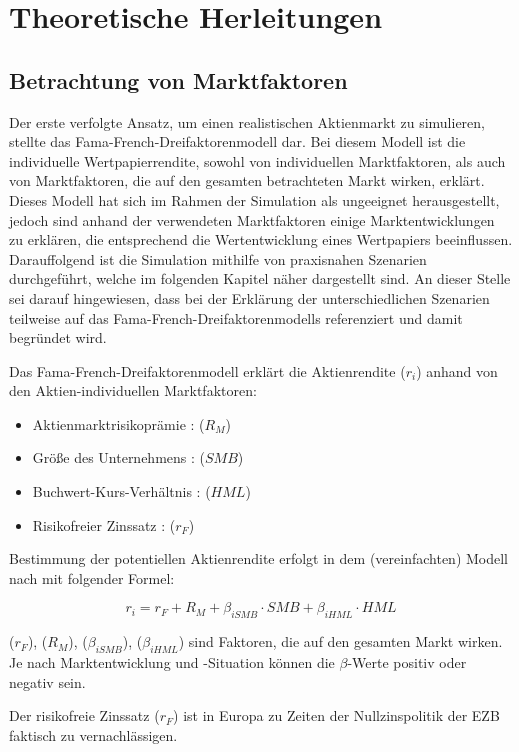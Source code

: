 \chapter{Theoretische Herleitungen}
\section{Betrachtung von Marktfaktoren}

Der erste verfolgte Ansatz, um einen realistischen Aktienmarkt zu simulieren, stellte das Fama-French-Dreifaktorenmodell dar. Bei diesem Modell ist die individuelle Wertpapierrendite, sowohl von individuellen Marktfaktoren, als auch von Marktfaktoren, die auf den gesamten betrachteten Markt wirken, erklärt. \\
Dieses Modell hat sich im Rahmen der Simulation als ungeeignet herausgestellt, jedoch sind anhand der verwendeten Marktfaktoren einige Marktentwicklungen zu erklären, die entsprechend die Wertentwicklung eines Wertpapiers beeinflussen.\\
Darauffolgend ist die Simulation mithilfe von praxisnahen Szenarien durchgeführt, welche im folgenden Kapitel näher dargestellt sind. An dieser Stelle sei darauf hingewiesen, dass bei der Erklärung der unterschiedlichen Szenarien teilweise auf das Fama-French-Dreifaktorenmodells referenziert und damit begründet wird.

Das Fama-French-Dreifaktorenmodell erklärt die Aktienrendite ($r_i$) anhand von den Aktien-individuellen Marktfaktoren:
\begin{itemize}
	\item Aktienmarktrisikoprämie : ($R_M$)
	\item Größe des Unternehmens : (${SMB}$)
	\item Buchwert-Kurs-Verhältnis : ($HML$)
	\item Risikofreier Zinssatz : ($r_F$)
\end{itemize}

Bestimmung der potentiellen Aktienrendite erfolgt in dem (vereinfachten) Modell nach mit folgender Formel:

$$ r_i = r_F + R_M + \beta_{iSMB} \cdot SMB + \beta_{iHML} \cdot HML$$

($r_F$), ($R_M$), ($\beta_{iSMB}$), ($\beta_{iHML}$) sind Faktoren, die auf den gesamten Markt wirken. Je nach Marktentwicklung und -Situation können die $\beta$-Werte positiv oder negativ sein.

Der risikofreie Zinssatz ($r_F$) ist in Europa zu Zeiten der Nullzinspolitik der EZB faktisch zu vernachlässigen.

